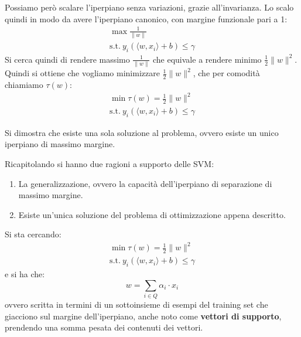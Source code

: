 Possiamo però scalare l'iperpiano senza variazioni, grazie all'invarianza.
Lo scalo quindi in modo da avere l'iperpiano canonico, con margine funzionale
pari a 1:
\begin{equation*}
    \begin{aligned}
        \max \frac{1}{\|w\|} \\ \text{s.t.} \ y_i(\langle w, x_i \rangle + b)
        \leq \gamma
    \end{aligned}
\end{equation*}
Si cerca quindi di rendere massimo $\frac{1}{\|w\|}$ che equivale a rendere
minimo $\frac{1}{2} \| w \|^2$. Quindi si ottiene che vogliamo minimizzare
$\frac{1}{2} \| w \|^2$, che per comodità chiamiamo $\tau (w)$:
\begin{equation*}
    \begin{aligned}
        \min \tau(w) = \frac{1}{2}  \| w\|^2 \\ \text{s.t.} \ y_i (\langle w, x_i
        \rangle + b) \leq \gamma
    \end{aligned}
\end{equation*}
\begin{teorema}
    Si dimostra che esiste una sola soluzione al problema, ovvero esiste un unico
    iperpiano di massimo margine.
\end{teorema}
Ricapitolando si hanno due ragioni a supporto delle SVM:
\begin{enumerate}
    \item La generalizzazione, ovvero la capacità dell'iperpiano di separazione
          di massimo margine.
    \item Esiste un'unica soluzione del problema di ottimizzazione appena descritto.
\end{enumerate}
Si sta cercando:
\begin{equation*}
    \begin{aligned}
        \min \tau(w) = \frac{1}{2}  \| w\|^2 \\ \text{s.t.} \ y_i (\langle w, x_i
        \rangle + b) \leq \gamma
    \end{aligned}
\end{equation*}
e si ha che:
\begin{equation}
    w = \sum_{i \in Q} \alpha_i \cdot x_i
\end{equation}
ovvero scritta in termini di un sottoinsieme di esempi del training set che
giacciono sul margine dell'iperpiano, anche noto come \textbf{vettori di supporto},
prendendo una somma pesata dei contenuti dei vettori.

